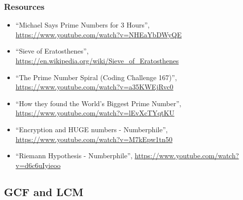 \subsubsection{Resources}
\begin{itemize}
	\item {\footnotesize ``Michael Says Prime Numbers for 3 Hours'', \url{https://www.youtube.com/watch?v=NHEaYbDWyQE}}
	\item {\footnotesize ``Sieve of Eratosthenes'', \url{https://en.wikipedia.org/wiki/Sieve_of_Eratosthenes}}
	\item {\footnotesize ``The Prime Number Spiral (Coding Challenge 167)'', \url{https://www.youtube.com/watch?v=a35KWEjRvc0}}
	\item {\footnotesize ``How they found the World's Biggest Prime Number'', \url{https://www.youtube.com/watch?v=lEvXcTYqtKU}}
	\item {\footnotesize ``Encryption and HUGE numbers - Numberphile'', \url{https://www.youtube.com/watch?v=M7kEpw1tn50}}
	\item {\footnotesize ``Riemann Hypothesis - Numberphile'', \url{https://www.youtube.com/watch?v=d6c6uIyieoo}}
\end{itemize}

\newpage 
\subsection{GCF and LCM}

